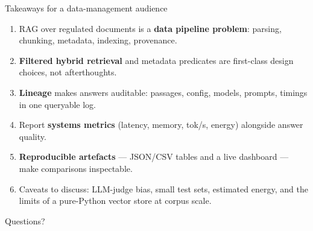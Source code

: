 \documentclass[aspectratio=169]{beamer}
\begin{document}
\begin{frame}{Takeaways for a data-management audience}
  \begin{enumerate}
    \item RAG over regulated documents is a \textbf{data pipeline problem}: parsing, chunking, metadata, indexing, provenance.
    \item \textbf{Filtered hybrid retrieval} and metadata predicates are first-class design choices, not afterthoughts.
    \item \textbf{Lineage} makes answers auditable: passages, config, models, prompts, timings in one queryable log.
    \item Report \textbf{systems metrics} (latency, memory, tok/s, energy) alongside answer quality.
    \item \textbf{Reproducible artefacts} --- JSON/CSV tables and a live dashboard --- make comparisons inspectable.
    \item Caveats to discuss: LLM-judge bias, small test sets, estimated energy, and the limits of a pure-Python vector store at corpus scale.
  \end{enumerate}
  \vspace{2mm}
  \centering \large Questions?
\end{frame}
\end{document}
